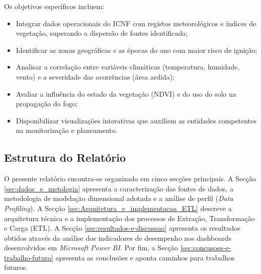 Os objetivos específicos incluem:
\begin{itemize}
	\item Integrar dados operacionais do ICNF com registos meteorológicos e índices de vegetação, superando a dispersão de fontes identificada;
	\item Identificar as zonas geográficas e as épocas do ano com maior risco de ignição;
	\item Analisar a correlação entre variáveis climáticas (temperatura, humidade, vento) e a severidade das ocorrências (área ardida);
	\item Avaliar a influência do estado da vegetação (NDVI) e do uso do solo na propagação do fogo;
	\item Disponibilizar visualizações interativas que auxiliem as entidades competentes na monitorização e planeamento.
\end{itemize}

\subsection{Estrutura do Relatório}
O presente relatório encontra-se organizado em cinco secções principais. A Secção \ref{sec:dados_e_metologia} apresenta a caracterização das fontes de dados, a metodologia de modelação dimensional adotada e a análise de perfil (\textit{Data Profiling}). A Secção \ref{sec:Arquitetura_e_implementacao_ETL} descreve a arquitetura técnica e a implementação dos processos de Extração, Transformação e Carga (ETL). A Secção \ref{sec:resultados-e-discussao} apresenta os resultados obtidos através da análise dos indicadores de desempenho nos dashboards desenvolvidos em \textit{Microsoft Power BI}. Por fim, a Secção \ref{sec:concusoes-e-trabalho-futuro} apresenta as conclusões e aponta caminhos para trabalhos futuros.